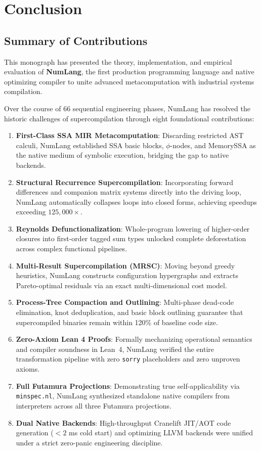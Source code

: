 \chapter{Conclusion}
\label{chap:conclusion}

\section{Summary of Contributions}
\label{sec:conclusion:summary}

This monograph has presented the theory, implementation, and empirical evaluation of \textbf{NumLang}, the first production programming language and native optimizing compiler to unite advanced metacomputation with industrial systems compilation.

Over the course of 66 sequential engineering phases, NumLang has resolved the historic challenges of supercompilation through eight foundational contributions:

\begin{enumerate}
    \item \textbf{First-Class SSA MIR Metacomputation}: Discarding restricted AST calculi, NumLang established SSA basic blocks, $\phi$-nodes, and MemorySSA as the native medium of symbolic execution, bridging the gap to native backends.
    \item \textbf{Structural Recurrence Supercompilation}: Incorporating forward differences and companion matrix systems directly into the driving loop, NumLang automatically collapses loops into closed forms, achieving speedups exceeding $125,000\times$.
    \item \textbf{Reynolds Defunctionalization}: Whole-program lowering of higher-order closures into first-order tagged sum types unlocked complete deforestation across complex functional pipelines.
    \item \textbf{Multi-Result Supercompilation (MRSC)}: Moving beyond greedy heuristics, NumLang constructs configuration hypergraphs and extracts Pareto-optimal residuals via an exact multi-dimensional cost model.
    \item \textbf{Process-Tree Compaction and Outlining}: Multi-phase dead-code elimination, knot deduplication, and basic block outlining guarantee that supercompiled binaries remain within 120\% of baseline code size.
    \item \textbf{Zero-Axiom Lean 4 Proofs}: Formally mechanizing operational semantics and compiler soundness in Lean~4, NumLang verified the entire transformation pipeline with zero \texttt{sorry} placeholders and zero unproven axioms.
    \item \textbf{Full Futamura Projections}: Demonstrating true self-applicability via \texttt{minspec.nl}, NumLang synthesized standalone native compilers from interpreters across all three Futamura projections.
    \item \textbf{Dual Native Backends}: High-throughput Cranelift JIT/AOT code generation ($<2$ ms cold start) and optimizing LLVM backends were unified under a strict zero-panic engineering discipline.
\end{enumerate}

